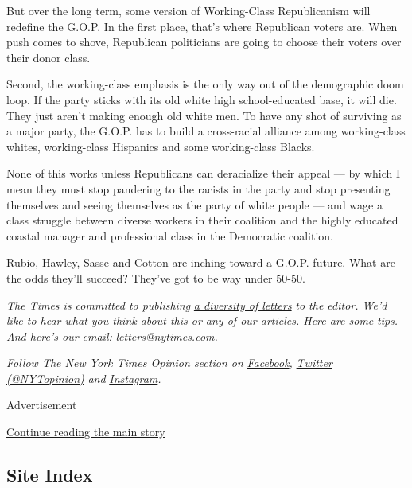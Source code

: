 But over the long term, some version of Working-Class Republicanism will
redefine the G.O.P. In the first place, that's where Republican voters
are. When push comes to shove, Republican politicians are going to
choose their voters over their donor class.

Second, the working-class emphasis is the only way out of the
demographic doom loop. If the party sticks with its old white high
school-educated base, it will die. They just aren't making enough old
white men. To have any shot of surviving as a major party, the G.O.P.
has to build a cross-racial alliance among working-class whites,
working-class Hispanics and some working-class Blacks.

None of this works unless Republicans can deracialize their appeal ---
by which I mean they must stop pandering to the racists in the party and
stop presenting themselves and seeing themselves as the party of white
people --- and wage a class struggle between diverse workers in their
coalition and the highly educated coastal manager and professional class
in the Democratic coalition.

Rubio, Hawley, Sasse and Cotton are inching toward a G.O.P. future. What
are the odds they'll succeed? They've got to be way under 50-50.

\emph{The Times is committed to publishing}
\href{https://www.nytimes.com/2019/01/31/opinion/letters/letters-to-editor-new-york-times-women.html}{\emph{a
diversity of letters}} \emph{to the editor. We'd like to hear what you
think about this or any of our articles. Here are some}
\href{https://help.nytimes.com/hc/en-us/articles/115014925288-How-to-submit-a-letter-to-the-editor}{\emph{tips}}\emph{.
And here's our email:}
\href{mailto:letters@nytimes.com}{\emph{letters@nytimes.com}}\emph{.}

\emph{Follow The New York Times Opinion section on}
\href{https://www.facebook.com/nytopinion}{\emph{Facebook}}\emph{,}
\href{http://twitter.com/NYTOpinion}{\emph{Twitter (@NYTopinion)}}
\emph{and}
\href{https://www.instagram.com/nytopinion/}{\emph{Instagram}}\emph{.}

Advertisement

\protect\hyperlink{after-bottom}{Continue reading the main story}

\hypertarget{site-index}{%
\subsection{Site Index}\label{site-index}}

